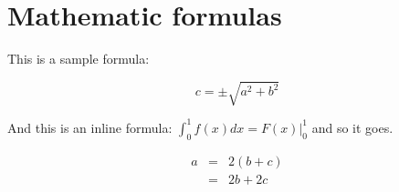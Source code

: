 
\section{Mathematic formulas}
This is a sample formula:

$$ c = \pm\sqrt{a^2 + b^2} $$

And this is an inline formula: $\int_0^1 f(x)dx = F(x)|_0^1$ and
so it goes.

\begin{eqnarray}
  a &=& 2(b+c) \\
    &=& 2b + 2c
\end{eqnarray}